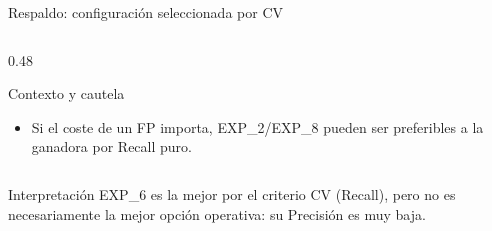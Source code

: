 \documentclass[aspectratio=169,11pt]{beamer}
\begin{document}
\begin{frame}{Respaldo: configuración seleccionada por CV}
\begin{columns}[T]
\begin{column}{0.48\textwidth}
\begin{block}{Contexto y cautela}
\begin{itemize}
                (92,31\,\%) con Precisión 6,78\,\% y F1 12,63\,\%.
          \item Si el coste de un FP importa, EXP\_2/EXP\_8 pueden
                ser preferibles a la ganadora por Recall puro.
        \end{itemize}
      \end{block}
    \end{column}
  \end{columns}
  \vspace{0.1cm}
  \begin{alertblock}{Interpretación}
    \small
    EXP\_6 es la mejor por el criterio CV (Recall), pero no es
    necesariamente la mejor opción operativa: su Precisión es muy baja.
  \end{alertblock}
\end{frame}
\end{document}
